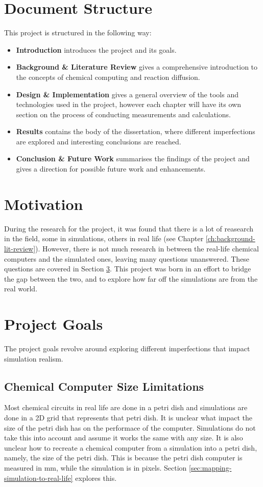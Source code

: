 \section{Document Structure}
This project is structured in the following way:

\begin{itemize}
    \item \textbf{Introduction} introduces the project and its goals.
    \item \textbf{Background \& Literature Review} gives a comprehensive introduction to the concepts of chemical computing and reaction diffusion.
    \item \textbf{Design \& Implementation} gives a general overview of the tools and technologies used in the project, however each chapter will have its own section on the process of conducting measurements and calculations.
    \item \textbf{Results} contains the body of the dissertation, where different imperfections are explored and interesting conclusions are reached.
    \item \textbf{Conclusion \& Future Work} summarises the findings of the project and gives a direction for possible future work and enhancements.
\end{itemize}

\section{Motivation}
During the research for the project, it was found that there is a lot of reasearch in the field, some in simulations, others in real life (see Chapter \ref{ch:background-lit-review}). 
However, there is not much research in between the real-life chemical computers and the simulated ones, leaving many questions unanswered. These questions are covered in Section \ref{sec:goals}.
This project was born in an effort to bridge the gap between the two, and to explore how far off the simulations are from the real world.


\section{Project Goals}\label{sec:goals}
The project goals revolve around exploring different imperfections that impact simulation realism.

\subsection{Chemical Computer Size Limitations} \label{sec:computer-size}
Most chemical circuits in real life are done in a petri dish and simulations are done in a 2D grid that represents that petri dish.
It is unclear what impact the size of the petri dish has on the performace of the computer. Simulations do not take this into account and assume it works the same with any size. 
It is also unclear how to recreate a chemical computer from a simulation into a petri dish, namely, the size of the petri dish. 
This is because the petri dish computer is measured in mm, while the simulation is in pixels. Section \ref{sec:mapping-simulation-to-real-life} explores this.


